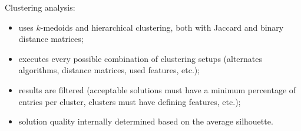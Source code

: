 \documentclass[xcolor=dvipsnames]{beamer}
\begin{document}
\begin{frame}[allowframebreaks]
\framebreak

Clustering analysis:
\begin{itemize}
\item
uses $k$-medoids and hierarchical clustering, both with Jaccard and binary
distance matrices;

\item
executes every possible combination of clustering setups (alternates algorithms,
distance matrices, used features, etc.);

\item
results are filtered (acceptable solutions must have a minimum percentage of
entries per cluster, clusters must have defining features, etc.);

\item
solution quality internally determined based on the average silhouette.
\end{itemize}








\end{frame}
\end{document}
